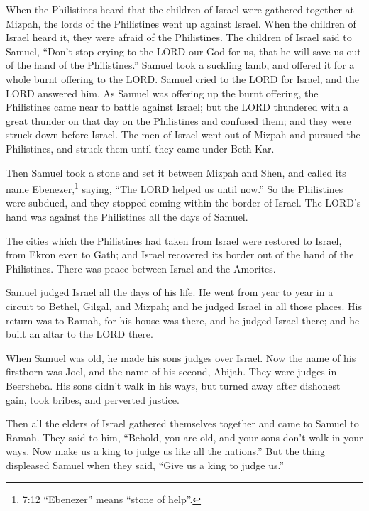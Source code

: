 \myverse{}When the Philistines heard that the children of Israel were gathered
together at Mizpah, the lords of the Philistines went up against Israel. When the children of Israel heard
it, they were afraid of the Philistines.
\myverse{}The children of Israel said to Samuel, “Don’t stop crying to the LORD our God
for us, that he will save us out of the hand of the Philistines.”
\myverse{}Samuel took a suckling lamb, and offered it for a whole burnt offering to the
LORD. Samuel cried to the LORD for Israel, and the LORD answered him.
\myverse{}As Samuel was offering up the burnt offering, the Philistines came near to
battle against Israel; but the LORD thundered with a great thunder on that day on the Philistines and
confused them; and they were struck down before Israel.
\myverse{}The men of Israel went out of Mizpah and pursued the Philistines, and struck
them until they came under Beth Kar.

\myverse{}Then Samuel took a stone and set it between Mizpah and Shen,
and called its name Ebenezer,\footnote{7:12 “Ebenezer” means “stone of help”.} saying, “The LORD helped us until now.”
\myverse{}So the Philistines were subdued, and they stopped coming within the border
of Israel. The LORD’s hand was against the Philistines all the days of Samuel.

\myverse{}The cities which the Philistines had taken from Israel were restored
to Israel, from Ekron even to Gath; and Israel recovered its border out of the hand of the Philistines.
There was peace between Israel and the Amorites.

\myverse{}Samuel judged Israel all the days of his life.
\myverse{}He went from year to year in a circuit to Bethel, Gilgal, and Mizpah; and
he judged Israel in all those places.
\myverse{}His return was to Ramah, for his house was there, and he judged Israel there;
and he built an altar to the LORD there.


\mychapter{} \myverse*{}When Samuel was old, he made his sons judges over Israel.
\myverse{}Now the name of his firstborn was Joel, and the name of his second, Abijah.
They were judges in Beersheba.
\myverse{}His sons didn’t walk in his ways, but turned away after dishonest gain, took
bribes, and perverted justice.

\myverse{}Then all the elders of Israel gathered themselves together and
came to Samuel to Ramah.
\myverse{}They said to him, “Behold, you are old, and your sons don’t walk in your ways.
Now make us a king to judge us like all the nations.”
\myverse{}But the thing displeased Samuel when they said, “Give us a king to judge us.”

